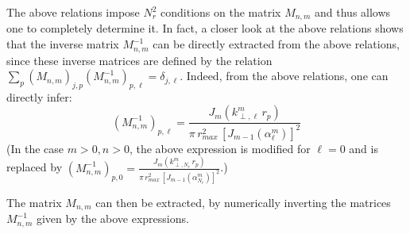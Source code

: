 The above relations impose $N_r^2$ conditions on the matrix
$M_{n,m}$ and thus allows one to completely
determine it. In fact, a closer look at the above relations shows
that the inverse matrix $M^{-1}_{n,m}$ can be directly extracted from the above relations,
since these inverse matrices are defined by the relation $\sum_p (M_{n,m})_{j,p}
(M^{-1}_{n,m})_{p,\ell} = \delta_{j,\ell}$. Indeed, from the above
relations, one can directly infer:
\[ (M_{n,m}^{-1})_{p,\ell} = \frac{ J_m(k^m_{\perp,\ell}\,r_p) } { \pi\,
  r_{max}^2\,[ J_{m-1}(\alpha_\ell^m)]^2  } \]
(In the case $m>0,n>0$, the above expression is modified for $\ell=0$ and
is replaced by $ (M_{n,m}^{-1})_{p,0} = \frac{ J_m(k^m_{\perp,N_r}\,r_p) } { \pi\,
  r_{max}^2\,[ J_{m-1}(\alpha_{N_r}^m)]^2  }$.)

The matrix $M_{n,m}$ can then be extracted, by numerically inverting the matrices  $M^{-1}_{n,m}$ given by the above expressions.
